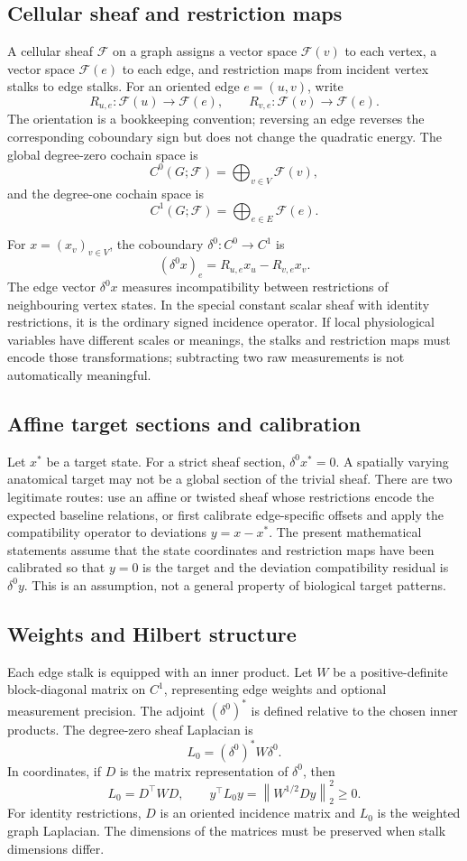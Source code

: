 \documentclass[12pt,a4paper]{article}
\newcommand{\norm}[1]{\left\lVert #1 \right\rVert}
\newcommand{\F}{\mathcal{F}}
\begin{document}
\subsection{Cellular sheaf and restriction maps}
A cellular sheaf \(\F\) on a graph assigns a vector space \(\F(v)\) to each vertex, a vector space \(\F(e)\) to each edge, and restriction maps from incident vertex stalks to edge stalks. For an oriented edge \(e=(u,v)\), write
\[
R_{u,e}:\F(u)\to\F(e),\qquad R_{v,e}:\F(v)\to\F(e).
\]
The orientation is a bookkeeping convention; reversing an edge reverses the corresponding coboundary sign but does not change the quadratic energy. The global degree-zero cochain space is
\[
C^0(G;\F)=\bigoplus_{v\in V}\F(v),
\]
and the degree-one cochain space is
\[
C^1(G;\F)=\bigoplus_{e\in E}\F(e).
\]

For \(x=(x_v)_{v\in V}\), the coboundary \(\delta^0:C^0\to C^1\) is
\[
(\delta^0x)_e=R_{u,e}x_u-R_{v,e}x_v.
\tag{1}\label{eq:coboundary}
\]
The edge vector \(\delta^0x\) measures incompatibility between restrictions of neighbouring vertex states. In the special constant scalar sheaf with identity restrictions, it is the ordinary signed incidence operator. If local physiological variables have different scales or meanings, the stalks and restriction maps must encode those transformations; subtracting two raw measurements is not automatically meaningful.

\subsection{Affine target sections and calibration}
Let \(x^*\) be a target state. For a strict sheaf section, \(\delta^0x^*=0\). A spatially varying anatomical target may not be a global section of the trivial sheaf. There are two legitimate routes: use an affine or twisted sheaf whose restrictions encode the expected baseline relations, or first calibrate edge-specific offsets and apply the compatibility operator to deviations \(y=x-x^*\). The present mathematical statements assume that the state coordinates and restriction maps have been calibrated so that \(y=0\) is the target and the deviation compatibility residual is \(\delta^0y\). This is an assumption, not a general property of biological target patterns.

\subsection{Weights and Hilbert structure}
Each edge stalk is equipped with an inner product. Let \(W\) be a positive-definite block-diagonal matrix on \(C^1\), representing edge weights and optional measurement precision. The adjoint \((\delta^0)^*\) is defined relative to the chosen inner products. The degree-zero sheaf Laplacian is
\[
L_0=(\delta^0)^*W\delta^0.
\tag{2}\label{eq:sheaflap}
\]
In coordinates, if \(D\) is the matrix representation of \(\delta^0\), then
\[
L_0=D^\top W D,\qquad y^\top L_0y=\norm{W^{1/2}Dy}_2^2\geq0.
\tag{3}\label{eq:energy}
\]
For identity restrictions, \(D\) is an oriented incidence matrix and \(L_0\) is the weighted graph Laplacian. The dimensions of the matrices must be preserved when stalk dimensions differ.
\end{document}
